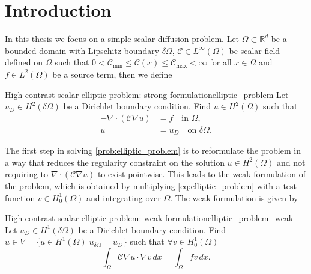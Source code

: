 \chapter{Introduction}\label{ch:introduction}
In this thesis we focus on a simple scalar diffusion problem. Let $\Omega\subset\mathbb{R}^d$ be a bounded domain with Lipschitz boundary $\delta\Omega$, $\mathcal{C}\in L^\infty(\Omega)$ be scalar field defined on $\Omega$ such that $0 < \mathcal{C}_{\min} \leq \mathcal{C}(x) \leq \mathcal{C}_{\max} < \infty$ for all $x\in\Omega$ and $f\in L^2(\Omega)$ be a source term, then we define
\begin{fancyprob}{High-contrast scalar elliptic problem: strong formulation}{elliptic_problem}
    Let $u_D\in H^2(\delta\Omega)$ be a Dirichlet boundary condition. Find $u\in H^2(\Omega)$ such that
    \begin{equation}
        \begin{aligned}
            -\nabla\cdot\left(\mathcal{C}\nabla u\right) & = f \quad \text{in } \Omega,           \\
            u                                       & = u_D \quad \text{on } \delta\Omega.
        \end{aligned}
        \label{eq:elliptic_problem}
    \end{equation}
\end{fancyprob}

The first step in solving \cref{prob:elliptic_problem} is to reformulate the problem in a way that reduces the regularity constraint on the solution $u\in H^2(\Omega)$ and not requiring to $\nabla\cdot\left(\mathcal{C}\nabla u\right)$ to exist pointwise. This leads to the weak formulation of the problem, which is obtained by multiplying \cref{eq:elliptic_problem} with a test function $v\in H^1_0(\Omega)$ and integrating over $\Omega$. The weak formulation is given by
\begin{fancyprob}{High-contrast scalar elliptic problem: weak formulation}{elliptic_problem_weak}
    Let $u_D\in H^1(\delta\Omega)$ be a Dirichlet boundary condition. Find $u\in V = \{u\in H^1(\Omega) | u_{\delta \Omega} = u_D\}$ such that $\forall v \in H^1_0(\Omega)$
    \begin{equation}
        \label{eq:galerkin}
        \int_\Omega \mathcal{C}\nabla u\cdot\nabla v\,dx = \int_\Omega f v\,dx.
    \end{equation}
\end{fancyprob}

